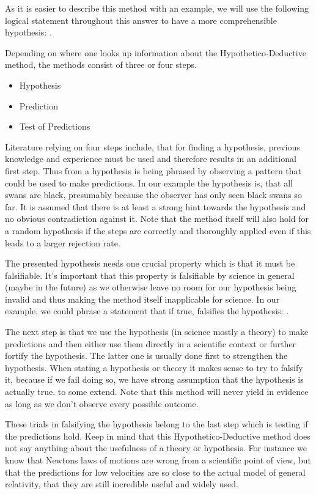 \documentclass[11pt]{scrartcl}
\begin{document}
As it is easier to describe this method with an example, we will use the following logical statement throughout this answer to have a more comprehensible hypothesis: .

Depending on where one looks up information about the Hypothetico-Deductive method, the methods consist of three or four steps.

\begin{itemize}
  \item Hypothesis
  \item Prediction
  \item Test of Predictions
\end{itemize}

Literature relying on four steps include, that for finding a hypothesis, previous knowledge and experience must be used and therefore results in an additional first step. Thus from a hypothesis is being phrased by observing a pattern that could be used to make predictions. In our example the hypothesis is, that all swans are black, presumably because the observer has only seen black swans so far. It is assumed that there is at least a strong hint towards the hypothesis and no obvious contradiction against it. Note that the method itself will also hold for a random hypothesis if the steps are correctly and thoroughly applied even if this leads to a larger rejection rate.

The presented hypothesis needs one crucial property which is that it must be falsifiable. It's important that this property is falsifiable by science in general (maybe in the future) as we otherwise leave no room for our hypothesis being invalid and thus making the method itself inapplicable for science. In our example, we could phrase a statement that if true, falsifies the hypothesis: .

The next step is that we use the hypothesis (in science mostly a theory) to make predictions and then either use them directly in a scientific context or further fortify the hypothesis. The latter one is usually done first to strengthen the hypothesis. When stating a hypothesis or theory it makes sense to try to falsify it, because if we fail doing so, we have strong assumption that the hypothesis is actually true. to some extend. Note that this method will never yield in evidence as long as we don't observe every possible outcome.

These trials in falsifying the hypothesis belong to the last step which is testing if the predictions hold. Keep in mind that this Hypothetico-Deductive method does not say anything about the usefulness of a theory or hypothesis. For instance we know that Newtons laws of motions are wrong from a scientific point of view, but that the predictions for low velocities are so close to the actual model of general relativity, that they are still incredible useful and widely used.
\end{document}
